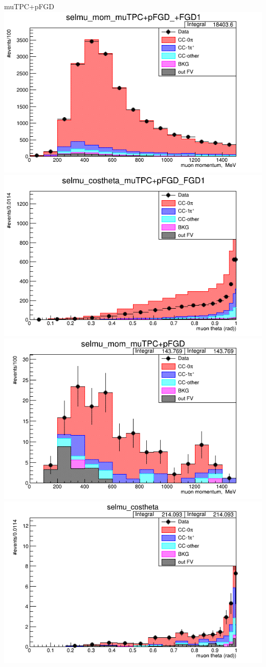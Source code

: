 \documentclass{beamer}
\begin{document}
\begin{frame}{muTPC+pFGD}
\center
\includegraphics[width=.45\textwidth]{images/selmu_mom_topology_muTPC+pFGD_accum_level[][0][29]_data_mc.png}
\includegraphics[width=.45\textwidth]{images/selmu_costheta_topology_muTPC+pFGD_accum_level[][0][29]_data_mc.png}
\includegraphics[width=.45\textwidth]{images/selmu_mom_fgd2topology_muTPC+pFGD_accum_level[][1][29]_data_mc.png}
\includegraphics[width=.45\textwidth]{images/selmu_costheta_fgd2topology_muTPC+pFGD_accum_level[][1][29]_data_mc.png}
\end{frame}
\end{document}

